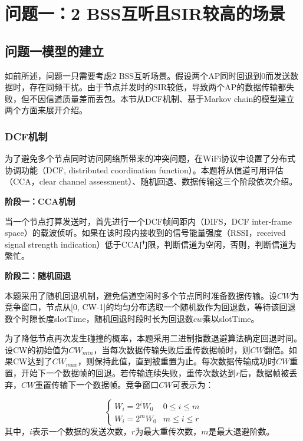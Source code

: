 \documentclass[bwprint]{gmcmthesis}
\begin{document}
\section{问题一：2 BSS互听且SIR较高的场景}


\subsection{问题一模型的建立}

如前所述，问题一只需要考虑2 BSS互听场景。假设两个AP同时回退到0而发送数据时，存在同频干扰。由于节点并发时的SIR较低，导致两个AP的数据传输都失败，但不因信道质量差而丢包。本节从DCF机制、基于Markov chain的模型建立两个方面来展开介绍。

\subsubsection{DCF机制}
为了避免多个节点同时访问网络所带来的冲突问题，在WiFi协议中设置了分布式协调功能（DCF, distributed coordination function）。本题将从信道可用评估（CCA，clear channel assessment）、随机回退、数据传输这三个阶段依次介绍。

\textbf{阶段一：CCA机制}

当一个节点打算发送时，首先进行一个DCF帧间距内（DIFS，DCF inter-frame space）的载波侦听。如果在该时段内接收到的信号能量强度（RSSI，received signal strength indication）低于CCA门限，判断信道为空闲，否则，判断信道为繁忙。

\textbf{阶段二：随机回退}

本题采用了随机回退机制，避免信道空闲时多个节点同时准备数据传输\cite{cite1}。设$CW$为竞争窗口，节点从[0, CW-1]的均匀分布选取一个随机数作为回退数，等待该回退数个时隙长度slotTime，随机回退时段时长为回退数$cw$乘以slotTime。

为了降低节点再次发生碰撞的概率，本题采用二进制指数退避算法确定回退时间。设CW的初始值为$CW_{min}$，当每次数据传输失败后重传数据帧时，则$CW$翻倍。如果CW达到了$CW_{max}$，则保持此值，直到被重置为止。每次数据传输成功时$CW$重置，开始下一个数据帧的回退。若传输连续失败，重传次数达到$r$后，数据帧被丢弃，$CW$重置传输下一个数据帧。竞争窗口$CW$可表示为：

\begin{equation}
    \left\{\begin{matrix}
 W_i=2^iW_0 & 0\le i\le  m \\
 W_i=2^mW_0 & m\le i\le  r
\end{matrix}\right.
    \label{eq:1.1.3}
\end{equation}
其中，$i$表示一个数据的发送次数，$r$为最大重传次数，$m$是最大退避阶数。
\end{document}
